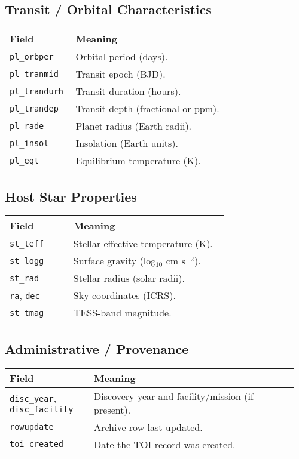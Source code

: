 \documentclass{article}
\begin{document}
\subsection*{Transit / Orbital Characteristics}
\begin{tabular}{@{}p{0.28\linewidth} p{0.68\linewidth}@{}}
\toprule
\textbf{Field} & \textbf{Meaning} \\ \midrule
\texttt{pl\_orbper} & Orbital period (days). \\
\texttt{pl\_tranmid} & Transit epoch (BJD). \\
\texttt{pl\_trandurh} & Transit duration (hours). \\
\texttt{pl\_trandep} & Transit depth (fractional or ppm). \\
\texttt{pl\_rade} & Planet radius (Earth radii). \\
\texttt{pl\_insol} & Insolation (Earth units). \\
\texttt{pl\_eqt} & Equilibrium temperature (K). \\
\bottomrule
\end{tabular}

\subsection*{Host Star Properties}
\begin{tabular}{@{}p{0.28\linewidth} p{0.68\linewidth}@{}}
\toprule
\textbf{Field} & \textbf{Meaning} \\ \midrule
\texttt{st\_teff} & Stellar effective temperature (K). \\
\texttt{st\_logg} & Surface gravity (log$_{10}$ cm s$^{-2}$). \\
\texttt{st\_rad} & Stellar radius (solar radii). \\
\texttt{ra}, \texttt{dec} & Sky coordinates (ICRS). \\
\texttt{st\_tmag} & TESS-band magnitude. \\
\bottomrule
\end{tabular}

\subsection*{Administrative / Provenance}
\begin{tabular}{@{}p{0.28\linewidth} p{0.68\linewidth}@{}}
\toprule
\textbf{Field} & \textbf{Meaning} \\ \midrule
\texttt{disc\_year}, \texttt{disc\_facility} & Discovery year and facility/mission (if present). \\
\texttt{rowupdate} & Archive row last updated. \\
\texttt{toi\_created} & Date the TOI record was created. \\
\bottomrule
\end{tabular}
\end{document}
